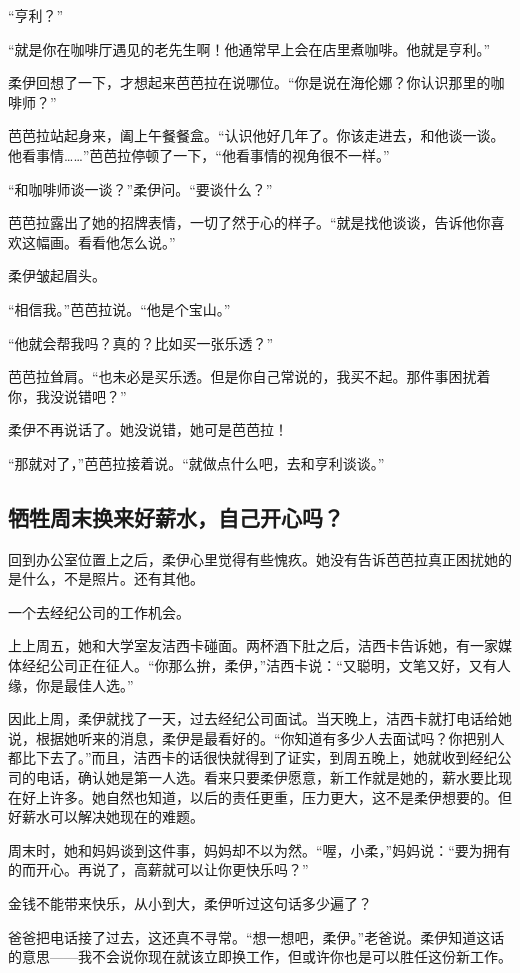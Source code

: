 “亨利？”

“就是你在咖啡厅遇见的老先生啊！他通常早上会在店里煮咖啡。他就是亨利。”

柔伊回想了一下，才想起来芭芭拉在说哪位。“你是说在海伦娜？你认识那里的咖啡师？”

芭芭拉站起身来，阖上午餐餐盒。“认识他好几年了。你该走进去，和他谈一谈。他看事情……”芭芭拉停顿了一下，“他看事情的视角很不一样。”

“和咖啡师谈一谈？”柔伊问。“要谈什么？”

芭芭拉露出了她的招牌表情，一切了然于心的样子。“就是找他谈谈，告诉他你喜欢这幅画。看看他怎么说。”

柔伊皱起眉头。

“相信我。”芭芭拉说。“他是个宝山。”

“他就会帮我吗？真的？比如买一张乐透？”

芭芭拉耸肩。“也未必是买乐透。但是你自己常说的，我买不起。那件事困扰着你，我没说错吧？”

柔伊不再说话了。她没说错，她可是芭芭拉！

“那就对了，”芭芭拉接着说。“就做点什么吧，去和亨利谈谈。”

\subsection{牺牲周末换来好薪水，自己开心吗？}

回到办公室位置上之后，柔伊心里觉得有些愧疚。她没有告诉芭芭拉真正困扰她的是什么，不是照片。还有其他。

一个去经纪公司的工作机会。

上上周五，她和大学室友洁西卡碰面。两杯酒下肚之后，洁西卡告诉她，有一家媒体经纪公司正在征人。“你那么拚，柔伊，”洁西卡说：“又聪明，文笔又好，又有人缘，你是最佳人选。”

因此上周，柔伊就找了一天，过去经纪公司面试。当天晚上，洁西卡就打电话给她说，根据她听来的消息，柔伊是最看好的。“你知道有多少人去面试吗？你把别人都比下去了。”而且，洁西卡的话很快就得到了证实，到周五晚上，她就收到经纪公司的电话，确认她是第一人选。看来只要柔伊愿意，新工作就是她的，薪水要比现在好上许多。她自然也知道，以后的责任更重，压力更大，这不是柔伊想要的。但好薪水可以解决她现在的难题。

周末时，她和妈妈谈到这件事，妈妈却不以为然。“喔，小柔，”妈妈说：“要为拥有的而开心。再说了，高薪就可以让你更快乐吗？”

金钱不能带来快乐，从小到大，柔伊听过这句话多少遍了？

爸爸把电话接了过去，这还真不寻常。“想一想吧，柔伊。”老爸说。柔伊知道这话的意思——我不会说你现在就该立即换工作，但或许你也是可以胜任这份新工作。


